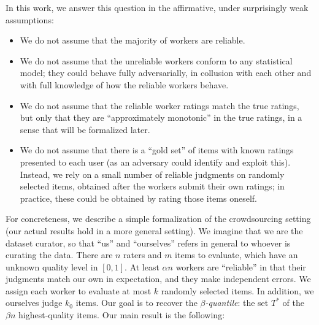 In this work, we answer this question in the affirmative, under surprisingly 
weak assumptions:
\begin{itemize}[itemsep=2pt,topsep=0pt,parsep=0pt,partopsep=0pt,leftmargin=30pt]
\item We do not assume that the majority of workers are reliable.
\item We do not assume that the unreliable workers conform to any statistical 
      model; they could behave fully adversarially, in collusion with each other 
      and with full knowledge of how the reliable workers behave.
\item We do not assume that the reliable worker ratings match the true ratings, but only that they are 
      ``approximately monotonic'' in the true ratings, in a sense that will be 
      formalized later.
\item We do not assume that there is a ``gold set'' of items with known ratings 
      presented to each user (as an adversary could identify and exploit this). 
      Instead, we rely on a small number of reliable judgments on randomly selected items, 
      obtained after the workers submit their own ratings; 
      in practice, these could be obtained by rating those items oneself.
\end{itemize}
For concreteness, we describe a simple formalization of the crowdsourcing 
setting (our actual results hold in a more general setting). 
We imagine that we are the dataset curator, so that ``us'' and ``ourselves'' refers 
in general to whoever is curating the data.
There are $n$ raters and $m$ items to evaluate, which have an unknown 
quality level in $[0,1]$. At least $\alpha n$ workers are ``reliable'' in that 
their judgments match our own in expectation, and they make independent errors.
We assign each worker to evaluate at most $k$ randomly selected items. 
In addition, we ourselves judge $k_0$ items. Our goal is to 
recover the \emph{$\beta$-quantile}: the set $T^*$ of the $\beta n$ highest-quality items. 
%
Our main result is the following:



